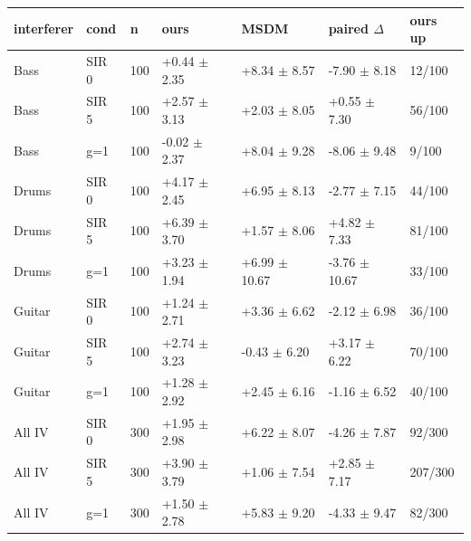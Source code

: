 \begin{tabular}{lllllll}
\toprule
interferer & cond & n & ours & MSDM & paired $\Delta$ & ours up\\
\midrule
Bass & SIR 0 & 100 & +0.44 $\pm$ 2.35 & +8.34 $\pm$ 8.57 & -7.90 $\pm$ 8.18 & 12/100\\
Bass & SIR 5 & 100 & +2.57 $\pm$ 3.13 & +2.03 $\pm$ 8.05 & +0.55 $\pm$ 7.30 & 56/100\\
Bass & g=1 & 100 & -0.02 $\pm$ 2.37 & +8.04 $\pm$ 9.28 & -8.06 $\pm$ 9.48 & 9/100\\
Drums & SIR 0 & 100 & +4.17 $\pm$ 2.45 & +6.95 $\pm$ 8.13 & -2.77 $\pm$ 7.15 & 44/100\\
Drums & SIR 5 & 100 & +6.39 $\pm$ 3.70 & +1.57 $\pm$ 8.06 & +4.82 $\pm$ 7.33 & 81/100\\
Drums & g=1 & 100 & +3.23 $\pm$ 1.94 & +6.99 $\pm$ 10.67 & -3.76 $\pm$ 10.67 & 33/100\\
Guitar & SIR 0 & 100 & +1.24 $\pm$ 2.71 & +3.36 $\pm$ 6.62 & -2.12 $\pm$ 6.98 & 36/100\\
Guitar & SIR 5 & 100 & +2.74 $\pm$ 3.23 & -0.43 $\pm$ 6.20 & +3.17 $\pm$ 6.22 & 70/100\\
Guitar & g=1 & 100 & +1.28 $\pm$ 2.92 & +2.45 $\pm$ 6.16 & -1.16 $\pm$ 6.52 & 40/100\\
All IV & SIR 0 & 300 & +1.95 $\pm$ 2.98 & +6.22 $\pm$ 8.07 & -4.26 $\pm$ 7.87 & 92/300\\
All IV & SIR 5 & 300 & +3.90 $\pm$ 3.79 & +1.06 $\pm$ 7.54 & +2.85 $\pm$ 7.17 & 207/300\\
All IV & g=1 & 300 & +1.50 $\pm$ 2.78 & +5.83 $\pm$ 9.20 & -4.33 $\pm$ 9.47 & 82/300\\
\bottomrule
\end{tabular}

